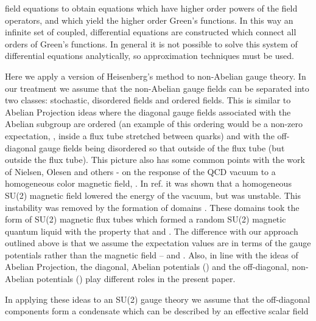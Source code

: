 \documentclass[a4paper,aps,showpacs]{revtex4}
\begin{document}
field equations to obtain equations which have higher
order powers of the field operators, and which yield the
higher order Green's functions. In this way an infinite set of
coupled, differential equations are constructed
which connect all orders of Green's functions. In general
it is not possible to solve this system of differential
equations analytically, so approximation techniques must
be used.
\par
Here we apply a version of Heisenberg's method to non-Abelian
gauge theory. In our treatment we assume that the non-Abelian
gauge fields can be separated into two classes: stochastic,
disordered fields and ordered fields. This is similar
to Abelian Projection ideas \cite{hooft}
where the diagonal gauge fields associated with the Abelian subgroup
are ordered (an example of this ordering would be a non-zero
expectation, \coordHE{}, inside a
flux tube stretched between quarks) and with the off-diagonal gauge
fields being disordered so that \coordHE{}
outside of the flux tube (but \coordHE{}
outside the flux tube). This picture also has some common
points with the work of Nielsen, Olesen and others
\cite{no1} - \cite{amb} on the response of the QCD vacuum to
a homogeneous color magnetic field, \coordHE{}. In ref. \cite{no1} it was
shown that a homogeneous SU(2) magnetic field lowered the
energy of the vacuum, but was unstable. This instability was
removed by the formation of domains \cite{no2}. These
domains took the form of SU(2) magnetic flux tubes which formed
a random SU(2) magnetic quantum liquid \cite{amb} with the
property that \coordHE{} and
\coordHE{}. The difference with our approach
outlined above is that we assume the expectation values are in
terms of the gauge potentials rather than the magnetic field --
\coordHE{} and \coordHE{}. Also, in line with the ideas of Abelian Projection, the
diagonal, Abelian potentials (\coordHE{}) and the off-diagonal,
non-Abelian potentials (\coordHE{}) play different roles
in the present paper.
\par
In applying these ideas to an SU(2)
gauge theory we assume that the off-diagonal components form a
condensate which can be described by an effective scalar field
\end{document}
